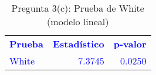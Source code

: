 \begin{table}[H]
\centering
\caption{Pregunta 3(c): Prueba de White (modelo lineal)}
\label{tab:q3c_white}
\begin{tabular}{lrr}
\rowcolor{blue!10}
\toprule
\rowcolor{blue!20}
\textcolor{blue}{\textbf{Prueba}} & \textcolor{blue}{\textbf{Estadístico}} & \textcolor{blue}{\textbf{p-valor}} \\
\addlinespace
\rowcolor{blue!10}
\textcolor{blue}{White} & \textcolor{blue}{7.3745} & \textcolor{blue}{0.0250} \\
\bottomrule
\end{tabular}
\end{table}
